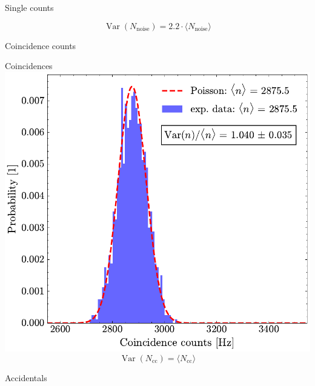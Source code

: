 \documentclass[10pt,aspectratio=43]{beamer}
\begin{document}
\begin{frame}{Single counts}
\begin{minipage}{.45\textwidth}
			\vspace*{-2em}
			\begin{equation*}
				\operatorname{Var}\!\left(N_{\text{noise}}\right) = 2.2 \cdot \langle N_{\text{noise}} \rangle
			\end{equation*}
		\end{minipage}
	\end{frame}
	
	\begin{frame}{Coincidence counts}
		\begin{minipage}{.45\textwidth}
			\centering
			Coincidences
			\vspace{2em}
			\includegraphics[width=\textwidth]{Images/CoincStatistics_2.pdf}
			\vspace*{-2.5em}
			\begin{equation*}
				\operatorname{Var}\!\left(N_{\text{cc}}\right) = \langle N_{\text{cc}} \rangle
			\end{equation*}
		\end{minipage}
		\hfill
		\begin{minipage}{.45\textwidth}
			\centering
			Accidentals
			\vspace{2em}

\end{minipage}
\end{frame}
\end{document}
